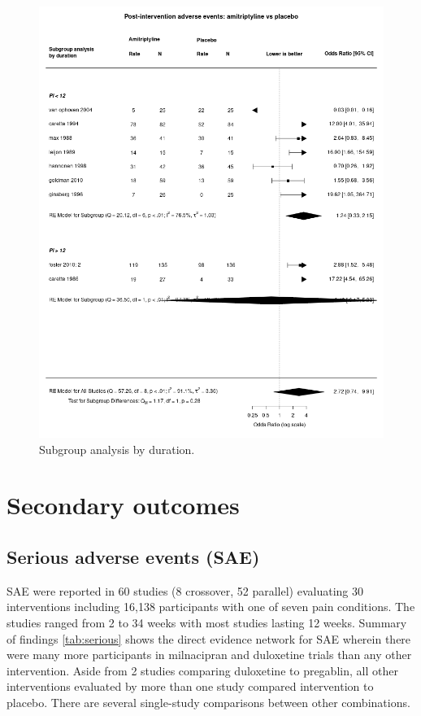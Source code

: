 \documentclass{report}\usepackage[]{graphicx}\usepackage[]{color}
\begin{document}
\begin{figure}

\includegraphics[width=\textwidth]{img/adverse-duration-amitriptyline-placebo-forest.png}
\caption[Adverse by duration: amitriptyline]{
Subgroup analysis by duration. 
}
\label{fig:adverse-duration-amitr-plac}
\end{figure}

\chapter{Secondary outcomes}


\section{Serious adverse events (SAE)}

SAE were reported in 60 studies (8 crossover, 52 parallel) evaluating 30 interventions including 16,138 participants with one of seven pain conditions. The studies ranged from  2 to 34 weeks with most studies lasting 12 weeks. Summary of findings \ref{tab:serious} shows the direct evidence network for SAE wherein there were many more participants in milnacipran and duloxetine trials than any other intervention. Aside from 2 studies comparing duloxetine to pregablin, all other interventions evaluated by more than one study compared intervention  to placebo. There are several single-study comparisons between other combinations.
\end{document}
